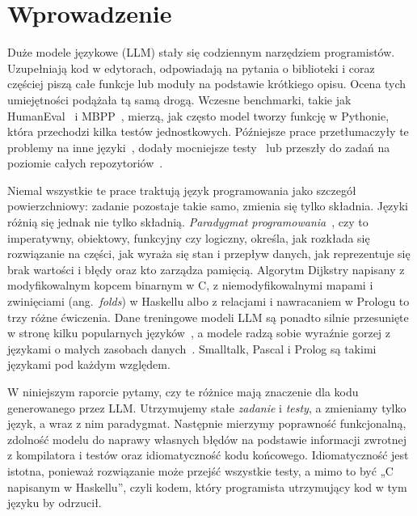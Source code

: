 \chapter{Wprowadzenie}
\label{ch:introduction}

Duże modele językowe (LLM) stały się codziennym narzędziem programistów. Uzupełniają kod
w edytorach, odpowiadają na pytania o biblioteki i coraz częściej piszą całe funkcje lub moduły na
podstawie krótkiego opisu. Ocena tych umiejętności podążała tą samą drogą. Wczesne benchmarki, takie
jak HumanEval~\cite{chen2021codex} i MBPP~\cite{austin2021mbpp}, mierzą, jak często model tworzy
funkcję w Pythonie, która przechodzi kilka testów jednostkowych. Późniejsze prace przetłumaczyły te
problemy na inne języki~\cite{cassano2023multiple,zheng2023codegeex,athiwaratkun2023mbxp}, dodały
mocniejsze testy~\cite{liu2023evalplus} lub przeszły do zadań na poziomie całych
repozytoriów~\cite{jimenez2024swebench}.

Niemal wszystkie te prace traktują język programowania jako szczegół powierzchniowy: zadanie
pozostaje takie samo, zmienia się tylko składnia. Języki różnią się jednak nie tylko składnią.
\emph{Paradygmat programowania}~\cite{floyd1979paradigms,vanroy2004ctm}, czy to imperatywny,
obiektowy, funkcyjny czy logiczny, określa, jak rozkłada się rozwiązanie na części, jak wyraża się
stan i przepływ danych, jak reprezentuje się brak wartości i błędy oraz kto zarządza pamięcią.
Algorytm Dijkstry napisany z modyfikowalnym kopcem binarnym w C, z niemodyfikowalnymi mapami
i zwinięciami (ang.~\emph{folds}) w Haskellu albo z relacjami i nawracaniem w Prologu to trzy różne
ćwiczenia. Dane treningowe modeli LLM są ponadto silnie przesunięte w stronę kilku popularnych
języków~\cite{kocetkov2022stack}, a modele radzą sobie wyraźnie gorzej z językami o małych zasobach
danych~\cite{cassano2023multiple,cassano2024knowledge}. Smalltalk, Pascal i Prolog są takimi
językami pod każdym względem.

W niniejszym raporcie pytamy, czy te różnice mają znaczenie dla kodu generowanego przez LLM.
Utrzymujemy stałe \emph{zadanie} i \emph{testy}, a zmieniamy tylko język, a wraz z nim paradygmat.
Następnie mierzymy poprawność funkcjonalną, zdolność modelu do naprawy własnych błędów na podstawie
informacji zwrotnej z kompilatora i testów oraz idiomatyczność kodu końcowego. Idiomatyczność jest
istotna, ponieważ rozwiązanie może przejść wszystkie testy, a mimo to być „C napisanym
w Haskellu”, czyli kodem, który programista utrzymujący kod w tym języku by odrzucił.

